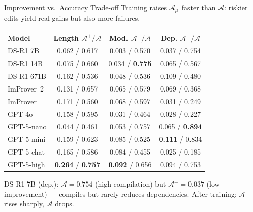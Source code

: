 \begin{frame}{Improvement vs.\ Accuracy Trade-off}
\vspace{0.3em}
\small Training raises $\mathcal{A}^+_\mu$ faster than $\mathcal{A}$: riskier edits yield real gains but also more failures.
\vspace{0.2em}
\begin{center}
\small
\setlength{\tabcolsep}{4pt}
\begin{tabular}{l|ccc}
\hline
\textbf{Model} & \textbf{Length} $\mathcal{A}^+ / \mathcal{A}$ & \textbf{Mod.} $\mathcal{A}^+ / \mathcal{A}$ & \textbf{Dep.} $\mathcal{A}^+ / \mathcal{A}$\\
\hline
DS-R1 7B      & 0.062 / 0.617 & 0.003 / 0.570 & 0.037 / 0.754\\
DS-R1 14B     & 0.075 / 0.660 & 0.034 / \textbf{0.775} & 0.065 / 0.567\\
DS-R1 671B    & 0.162 / 0.536 & 0.048 / 0.536 & 0.109 / 0.480\\
\hline
ImProver~2    & 0.131 / 0.657 & 0.065 / 0.579 & 0.069 / 0.368\\
\hline
ImProver      & 0.171 / 0.560 & 0.068 / 0.597 & 0.031 / 0.249\\
GPT-4o        & 0.158 / 0.595 & 0.031 / 0.464 & 0.028 / 0.227\\
GPT-5-nano    & 0.044 / 0.461 & 0.053 / 0.757 & 0.065 / \textbf{0.894}\\
GPT-5-mini    & 0.159 / 0.623 & 0.085 / 0.525 & \textbf{0.111} / 0.834\\
GPT-5-chat    & 0.165 / 0.586 & 0.084 / 0.455 & 0.025 / 0.185\\
GPT-5-high    & \textbf{0.264} / \textbf{0.757} & \textbf{0.092} / 0.656 & 0.094 / 0.753\\
\hline
\end{tabular}
\end{center}
\vspace{0.2em}
\small DS-R1 7B (dep.): $\mathcal{A}=0.754$ (high compilation) but $\mathcal{A}^+=0.037$ (low improvement) --- compiles but rarely reduces dependencies. After training: $\mathcal{A}^+$ rises sharply, $\mathcal{A}$ drops.
\end{frame}

